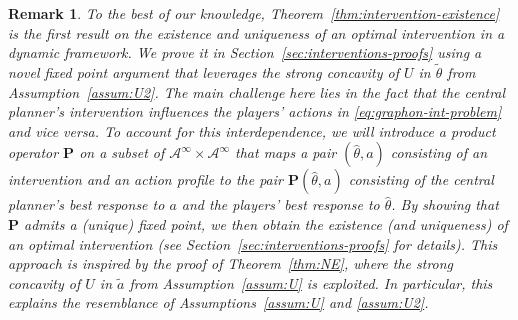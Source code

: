 \documentclass[11pt]{article}
\newtheorem{remark}[theorem]{Remark}
\numberwithin{equation}{section}
\begin{document}
\begin{remark}
To the best of our knowledge, Theorem~\ref{thm:intervention-existence} is the first result on the existence and uniqueness of an optimal intervention in a dynamic framework. We prove it in Section~\ref{sec:interventions-proofs} using a novel fixed point argument that leverages the strong concavity of $U$ in $\tilde\theta$ from Assumption~\ref{assum:U2}. The main challenge here lies in the fact that the central planner's intervention influences the players' actions in \eqref{eq:graphon-int-problem} and vice versa. To account for this interdependence, we will introduce a product operator $\boldsymbol{P}$ on a subset of $\mathcal{A}^\infty\times\mathcal{A}^\infty$ that maps a pair $(\hat\theta,a)$ consisting of an intervention and an action profile to the pair $\boldsymbol{P}(\hat\theta,a)$ consisting of the central planner's best response to $a$ and the players' best response to $\hat\theta$. By showing that $\boldsymbol{P}$ admits a (unique) fixed point, we then obtain the existence (and uniqueness) of an optimal intervention (see Section~\ref{sec:interventions-proofs} for details). This approach is inspired by the proof of Theorem~\ref{thm:NE}, where the strong concavity of $U$ in $\tilde a$ from Assumption~\ref{assum:U} is exploited. In particular, this explains the resemblance of Assumptions~\ref{assum:U} and \ref{assum:U2}.
\end{remark}
\end{document}
